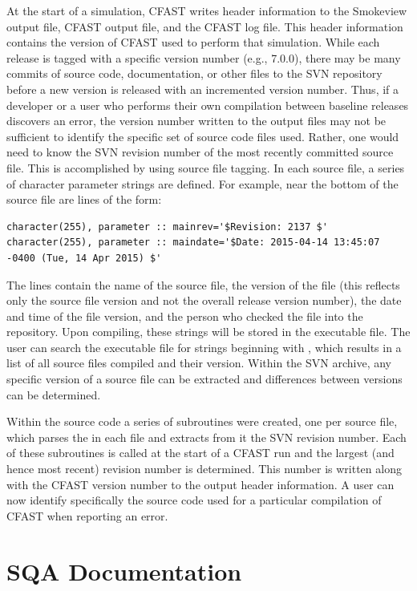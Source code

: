 At the start of a simulation, CFAST writes header information to the Smokeview output file, CFAST output file, and the CFAST log file.  This header information contains the version of CFAST used to perform that simulation. While each release is tagged with a specific version number (e.g., 7.0.0), there may be many commits of source code, documentation, or other files to the SVN repository before a new version is released with an incremented version number.  Thus, if a developer or a user who performs their own compilation between baseline releases discovers an error, the version number written to the output files may not be sufficient to identify the specific set of source code files used.  Rather, one would need to know the SVN revision number of the most recently committed source file. This is accomplished by using source file tagging. In each source file, a series of character parameter strings are defined. For example, near the bottom of the source file  are lines of the form:
\begin{lstlisting}
character(255), parameter :: mainrev='$Revision: 2137 $'
character(255), parameter :: maindate='$Date: 2015-04-14 13:45:07 -0400 (Tue, 14 Apr 2015) $'
\end{lstlisting}
The lines contain the name of the source file, the version of the file (this reflects only the source file version and not the overall release version number), the date and time of the file version, and the person who checked the file into the repository. Upon compiling, these strings will be stored in the executable file.  The user can search the executable file for strings beginning with , which results in a list of all source files compiled and their version. Within the SVN archive, any specific version of a source file can be extracted and differences between versions can be determined.

Within the source code a series of subroutines were created, one per source file, which parses the  in each file and extracts from it the SVN revision number.  Each of these subroutines is called at the start of a CFAST run and the largest (and hence most recent) revision number is determined.  This number is written along with the CFAST version number to the output header information.  A user can now identify specifically the source code used for a particular compilation of CFAST when reporting an error.


\section{SQA Documentation}


